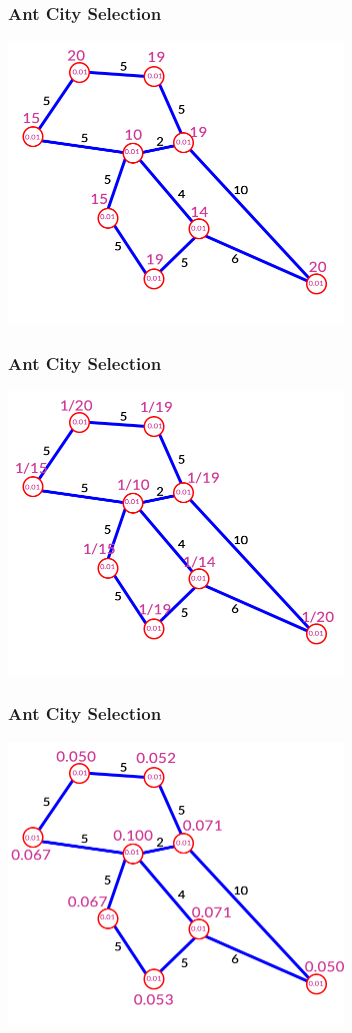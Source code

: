 \documentclass[12pt]{beamer}
\begin{document}
\begin{frame}
\frametitle{Ant City Selection}
\begin{center}
\includegraphics[height=75mm]{Images/pheromone2}\\
\end{center}
\end{frame}
\begin{frame}
\frametitle{Ant City Selection}
\begin{center}
\includegraphics[height=75mm]{Images/pheromone3}\\
\end{center}
\end{frame}
\begin{frame}
\frametitle{Ant City Selection}
\begin{center}
\includegraphics[height=75mm]{Images/pheromone4}\\
\end{center}
\end{frame}
\end{document}
